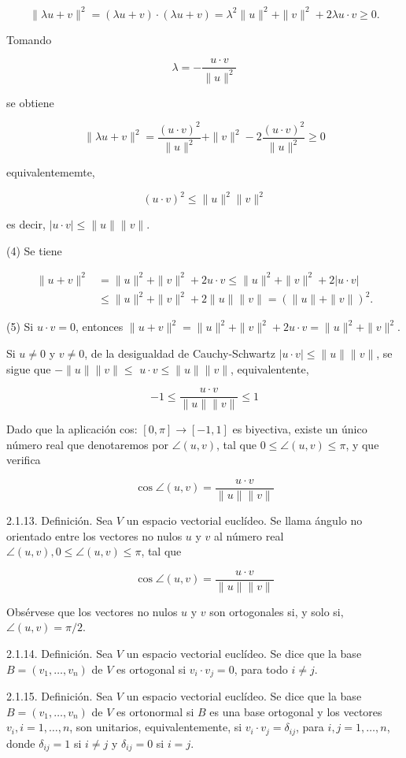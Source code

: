 \documentclass[12pt, a4paper, ones, notitlepage, openany,titlepage]{article}
\begin{document}
$$
\|\lambda u+v\|^{2}=(\lambda u+v) \cdot(\lambda u+v)=\lambda^{2}\|u\|^{2}+\|v\|^{2}+2 \lambda u \cdot v \geq 0 .
$$

Tomando

$$
\lambda=-\frac{u \cdot v}{\|u\|^{2}}
$$

se obtiene

$$
\|\lambda u+v\|^{2}=\frac{(u \cdot v)^{2}}{\|u\|^{2}}+\|v\|^{2}-2 \frac{(u \cdot v)^{2}}{\|u\|^{2}} \geq 0
$$

equivalentememte,

$$
(u \cdot v)^{2} \leq\|u\|^{2}\|v\|^{2}
$$

es decir, $|u \cdot v| \leq\|u\|\|v\|$.

(4) Se tiene

$$
\begin{aligned}
	\|u+v\|^{2} & =\|u\|^{2}+\|v\|^{2}+2 u \cdot v \leq\|u\|^{2}+\|v\|^{2}+2|u \cdot v| \\
	& \leq\|u\|^{2}+\|v\|^{2}+2\|u\|\|v\|=(\|u\|+\|v\|)^{2} .
\end{aligned}
$$

(5) Si $u \cdot v=0$, entonces $\|u+v\|^{2}=\|u\|^{2}+\|v\|^{2}+2 u \cdot v=\|u\|^{2}+\|v\|^{2}$.

Si $u \neq 0$ y $v \neq 0$, de la desigualdad de Cauchy-Schwartz $|u \cdot v| \leq\|u\|\|v\|$, se sigue que $-\|u\|\|v\| \leq$ $u \cdot v \leq\|u\|\|v\|$, equivalentente,

$$
-1 \leq \frac{u \cdot v}{\|u\|\|v\|} \leq 1
$$

Dado que la aplicación cos: $[0, \pi] \rightarrow[-1,1]$ es biyectiva, existe un único número real que denotaremos por $\angle(u, v)$, tal que $0 \leq \angle(u, v) \leq \pi$, y que verifica

$$
\cos \angle(u, v)=\frac{u \cdot v}{\|u\|\|v\|}
$$

2.1.13. Definición. Sea $V$ un espacio vectorial euclídeo. Se llama ángulo no orientado entre los vectores no nulos $u$ y $v$ al número real $\angle(u, v), 0 \leq \angle(u, v) \leq \pi$, tal que

$$
\cos \angle(u, v)=\frac{u \cdot v}{\|u\|\|v\|}
$$

Obsérvese que los vectores no nulos $u$ y $v$ son ortogonales si, y solo si, $\angle(u, v)=\pi / 2$.

2.1.14. Definición. Sea $V$ un espacio vectorial euclídeo. Se dice que la base $B=\left(v_{1}, \ldots, v_{n}\right)$ de $V$ es ortogonal si $v_{i} \cdot v_{j}=0$, para todo $i \neq j$.

2.1.15. Definición. Sea $V$ un espacio vectorial euclídeo. Se dice que la base $B=\left(v_{1}, \ldots, v_{n}\right)$ de $V$ es ortonormal si $B$ es una base ortogonal y los vectores $v_{i}, i=1, \ldots, n$, son unitarios, equivalentemente, si $v_{i} \cdot v_{j}=\delta_{i j}$, para $i, j=1, \ldots, n$, donde $\delta_{i j}=1$ si $i \neq j$ y $\delta_{i j}=0$ si $i=j$.
\end{document}
